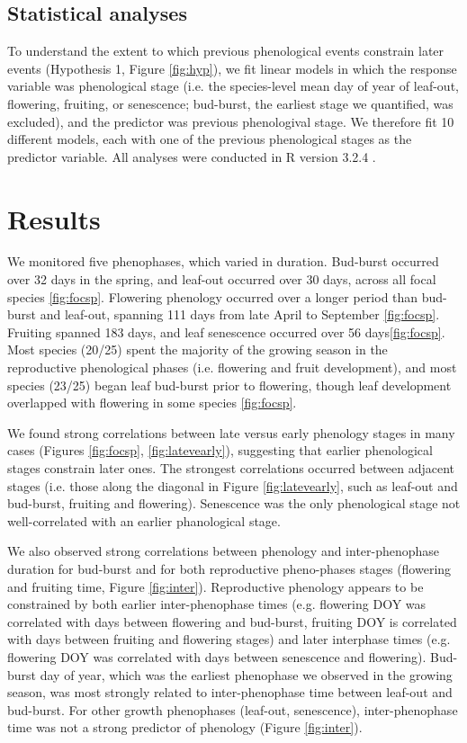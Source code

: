 \documentclass{article}
\begin{document}
\subsection*{Statistical analyses}
To understand the extent to which previous phenological events constrain later events (Hypothesis 1, Figure \ref{fig:hyp}), we fit linear models in which the response variable was phenological stage (i.e. the species-level mean day of year of leaf-out, flowering, fruiting, or senescence; bud-burst, the earliest stage we quantified, was excluded), and the predictor was previous phenologival stage.  We therefore fit 10 different models, each with one of the previous phenological stages as the predictor variable. 
All analyses were conducted in R version 3.2.4 \citep{rcoreteam2016}.

\section* {Results}
\par We monitored five phenophases, which varied in duration. Bud-burst occurred over 32 days in the spring, and leaf-out occurred over 30 days, across all focal species \ref{fig:focsp}. Flowering phenology occurred over a longer period than bud-burst and leaf-out, spanning 111 days from late April to September \ref{fig:focsp}. Fruiting spanned 183 days, and leaf senescence occurred over 56 days\ref{fig:focsp}. %
Most species (20/25) spent the majority of the growing season in the reproductive phenological phases (i.e. flowering and fruit development), and most species (23/25) began leaf bud-burst prior to flowering, though leaf development overlapped with flowering in some species \ref{fig:focsp}.
\par We found strong correlations between late versus early phenology stages in many cases (Figures \ref{fig:focsp}, \ref{fig:latevearly}), suggesting that earlier phenological stages constrain later ones. The strongest correlations occurred between adjacent stages (i.e. those along the diagonal in Figure \ref{fig:latevearly}, such as leaf-out and bud-burst, fruiting and flowering). Senescence was the only phenological stage not well-correlated with an earlier phanological stage.
\par We also observed strong correlations between phenology and inter-phenophase duration for bud-burst and for both reproductive pheno-phases stages (flowering and fruiting time, Figure \ref{fig:inter}). Reproductive phenology appears to be constrained by both earlier inter-phenophase times (e.g. flowering DOY was correlated with days between flowering and bud-burst, fruiting DOY is correlated with days between fruiting and flowering stages) and later interphase times (e.g. flowering DOY was correlated with days between senescence and flowering). Bud-burst day of year, which was the earliest phenophase we observed in the growing season, was most strongly related to inter-phenophase time between leaf-out and bud-burst. For other growth phenophases (leaf-out, senescence), inter-phenophase time was not a strong predictor of phenology (Figure \ref{fig:inter}). 
\end{document}
